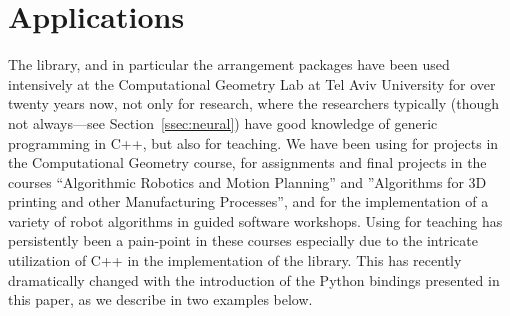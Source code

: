 \section{Applications}
\label{sec:app}
The \cgal{} library, and in particular the \cgal{} arrangement
packages have been used intensively at the Computational Geometry Lab
at Tel Aviv University for over twenty years now, not only for
research, where the researchers typically (though not always---see
Section~\ref{ssec:neural}) have good knowledge of generic programming
in C++, but also for teaching. We have been using \cgal{} for projects
in the Computational Geometry course, for assignments and final
projects in the courses ``Algorithmic Robotics and Motion Planning''
and ''Algorithms for 3D printing and other Manufacturing Processes'',
and for the implementation of a variety of robot algorithms in guided
software workshops. Using \cgal{} for teaching has persistently been a
pain-point in these courses especially due to the intricate
utilization of C++ in the implementation of the library. This has
recently dramatically changed with the introduction of the Python
bindings presented in this paper, as we describe in two examples below.


